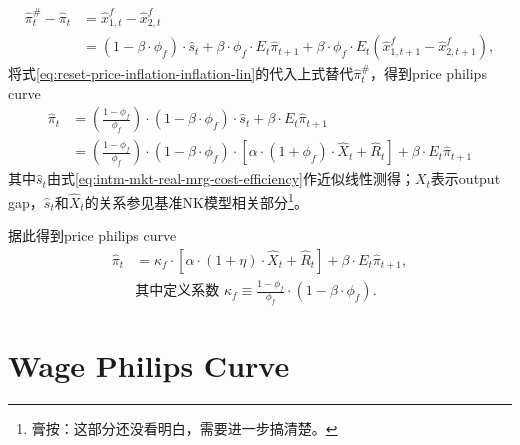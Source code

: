\begin{equation}
\begin{split}
\hat{\pi}^{\#}_t - \hat{\pi}_t &= \hat{x}^f_{1,t} - \hat{x}^f_{2,t} \\
&= \left(1 - \beta \cdot \phi_f \right) \cdot \hat{s}_t
+ \beta \cdot \phi_f \cdot E_t \hat{\pi}_{t+1}
+ \beta \cdot \phi_f \cdot E_t \left(\hat{x}^f_{1,t+1} - \hat{x}^f_{2,t+1}\right),
\end{split}
\end{equation}
将式\eqref{eq:reset-price-inflation-inflation-lin}的代入上式替代$\hat{\pi}^{\#}_t$，得到price philips curve
\begin{equation*}
\begin{split}
\hat{\pi}_t &= \left(\frac{1- \phi_f}{\phi_f}\right) \cdot \left(1-\beta \cdot \phi_f \right) \cdot \hat{s}_t +  \beta \cdot E_t \hat{\pi}_{t+1} \\
&=\left(\frac{1- \phi_f}{\phi_f}\right) \cdot \left(1-\beta \cdot \phi_f \right) \cdot \left[\alpha \cdot \left(1+\phi_f\right) \cdot \hat{X}_t + \hat{R}_t\right]
+ \beta \cdot E_t \hat{\pi}_{t+1}
\end{split}
\end{equation*}
其中$\hat{s}_t$由式\eqref{eq:intm-mkt-real-mrg-cost-efficiency}作近似线性测得；$X_t$表示output gap，$\hat{s}_t$和$\hat{X}_t$的关系参见基准NK模型相关部分\footnote{膏按：这部分还没看明白，需要进一步搞清楚。}。

据此得到price philips curve
\begin{equation}
\label{eq:price-PC-lin}
\begin{split}
\hat{\pi}_t &= \kappa_f \cdot \left[\alpha \cdot \left(1+\eta\right) \cdot \hat{X}_t + \hat{R}_t\right] + \beta \cdot E_t \hat{\pi}_{t+1},\\
&\text{其中定义系数 } \kappa_f \equiv \frac{1-\phi_f}{\phi_f} \cdot \left(1-\beta \cdot \phi_f \right).
\end{split}
\end{equation}

\section{Wage Philips Curve}
\label{sec:wage-Philips-Curve-me}

